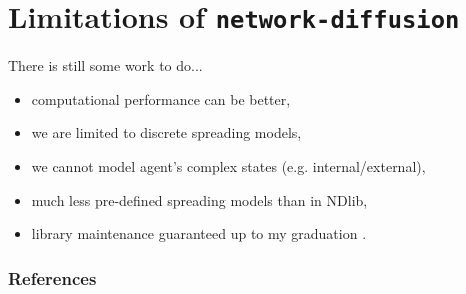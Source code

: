 \documentclass{beamer}
\begin{document}
\section{Limitations of \lstinline[style=py]{network-diffusion}}

\begin{frame}{\secname}
    There is still some work to do...
    \vspace{1em}
    \begin{itemize}
        \item computational performance can be better,
        \item we are limited to discrete spreading models,
        \item we cannot model agent's complex states (e.g. internal/external),
        \item much less pre-defined spreading models than in NDlib,
        \item library maintenance guaranteed up to my graduation \Winkey.
    \end{itemize}
\end{frame}

\begin{frame}[allowframebreaks]
    \frametitle{References}
    \printbibliography
\end{frame}

\addtocounter{framenumber}{1}
\end{document}
